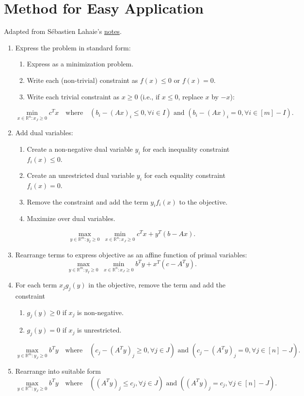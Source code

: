 \documentclass[a4paper,12pt,fleqn]{article}
\newenvironment*{tightenum}{\begin{enumerate}[noitemsep]}{\end{enumerate}}
\begin{document}
\section{Method for Easy Application}

Adapted from S\'ebastien Lahaie's \href{http://www.cs.columbia.edu/coms6998-3/lpprimer.pdf}{notes}.

\begin{enumerate}
\item Express the problem in standard form:
    \begin{tightenum}
    \item Express as a minimization problem.
    \item Write each (non-trivial) constraint as $f(x) \le 0$ or $f(x) = 0$.
    \item Write each trivial constraint as $x \ge 0$ (i.e., if $x \le 0$, replace $x$ by $-x$):
    \end{tightenum}
\[ \min_{x \in \mathbb{R}^n: x_J \ge 0} c^Tx \quad\textrm{where}\quad
(b_i - (Ax)_i \le 0, \forall i \in I) \textrm{ and } (b_i - (Ax)_i = 0, \forall i \in [m]-I). \]
\item Add dual variables:
    \begin{tightenum}
    \item Create a non-negative dual variable $y_i$ for each inequality constraint $f_i(x) \le 0$.
    \item Create an unrestricted dual variable $y_i$ for each equality constraint $f_i(x) = 0$.
    \item Remove the constraint and add the term $y_if_i(x)$ to the objective.
    \item Maximize over dual variables.
    \end{tightenum}
\[ \max_{y \in \mathbb{R}^m: y_I \ge 0}\; \min_{x \in \mathbb{R}^n: x_J \ge 0} c^Tx + y^T(b - Ax). \]
\item Rearrange terms to express objective as an affine function of primal variables:
\[ \max_{y \in \mathbb{R}^m: y_I \ge 0}\; \min_{x \in \mathbb{R}^n: x_J \ge 0} b^Ty + x^T(c - A^Ty). \]
\item For each term $x_jg_j(y)$ in the objective, remove the term and add the constraint
    \begin{tightenum}
    \item $g_j(y) \ge 0$ if $x_j$ is non-negative.
    \item $g_j(y) = 0$ if $x_j$ is unrestricted.
    \end{tightenum}
\[ \max_{y \in \mathbb{R}^m: y_J \ge 0} b^Ty \quad\textrm{where}\quad
(c_j - (A^Ty)_j \ge 0, \forall j \in J) \textrm{ and } (c_j - (A^Ty)_j = 0, \forall j \in [n]-J). \]
\item Rearrange into suitable form
\[ \max_{y \in \mathbb{R}^m: y_J \ge 0} b^Ty \quad\textrm{where}\quad
((A^Ty)_j \le c_j, \forall j \in J) \textrm{ and } ((A^Ty)_j = c_j, \forall j \in [n]-J). \]
\end{enumerate}
\end{document}
